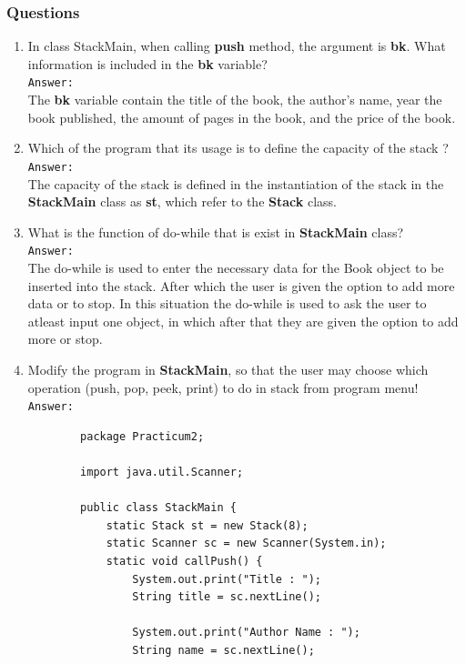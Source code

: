 \documentclass[12pt,titlepage]{article}
\begin{document}
\subsubsection{Questions}

\begin{enumerate}
    \item In class StackMain, when calling \textbf{push} method, the argument is \textbf{bk}. What information is included in the \textbf{bk} variable?
    \mbox{}\\
    \texttt{Answer: }
    \mbox{}\\
    The \textbf{bk} variable contain the title of the book, the author's name, year the book published, the amount of pages in the book, and the price of the book.
    \item Which of the program that its usage is to define the capacity of the stack ?
    \mbox{}\\
    \texttt{Answer: }
    \mbox{}\\
    The capacity of the stack is defined in the instantiation of the stack in the \textbf{StackMain} class as \textbf{st}, which refer to the \textbf{Stack} class.
    \item What is the function of do-while that is exist in \textbf{StackMain} class?
    \mbox{}\\
    \texttt{Answer: }
    \mbox{}\\
    The do-while is used to enter the necessary data for the Book object to be inserted into the stack. After which the user is given the option to add more data or to stop. In this situation the do-while is used to ask the user to atleast input one object, in which after that they are given the option to add more or stop.
    \item Modify the program in \textbf{StackMain}, so that the user may choose which operation (push, pop, peek, print) to do in stack from program menu!
    \mbox{}\\
    \texttt{Answer: }
    \begin{verbatim}
        package Practicum2;

        import java.util.Scanner;

        public class StackMain {
            static Stack st = new Stack(8);
            static Scanner sc = new Scanner(System.in);
            static void callPush() {
                System.out.print("Title : ");
                String title = sc.nextLine();
                
                System.out.print("Author Name : ");
                String name = sc.nextLine();


\end{verbatim}
\end{enumerate}
\end{document}
